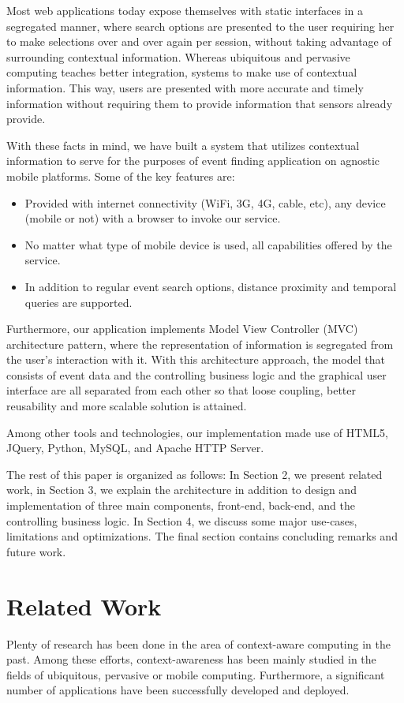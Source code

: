 \documentclass{acm_proc_article-sp}
\begin{document}
Most web applications today expose themselves with static interfaces in a segregated manner, where search options are presented to the user requiring her to make selections over and over again per session, without taking advantage of surrounding contextual information. Whereas ubiquitous and pervasive computing teaches better integration, systems to make use of contextual information. This way, users are presented with more accurate and timely information without requiring them to provide information that sensors already provide.

With these facts in mind, we have built a system that utilizes contextual information to serve for the purposes of event finding application on agnostic mobile platforms. Some of the key features are:
\begin{itemize}
\item Provided with internet connectivity (WiFi, 3G, 4G, cable, etc), any device (mobile or not) with a browser to invoke our service.
\item No matter what type of mobile device is used, all capabilities offered by the service. 
\item In addition to regular event search options, distance proximity and temporal queries are supported. 
\end{itemize}

Furthermore, our application implements Model View Controller (MVC) architecture pattern, where the representation of information is segregated from the user's interaction with it. With this architecture approach, the model that consists of event data and the controlling business logic and the graphical user interface are all separated from each other so that loose coupling, better reusability and more scalable solution is attained.

Among other tools and technologies, our implementation made use of HTML5, JQuery, Python, MySQL, and Apache HTTP Server.

The rest of this paper is organized as follows: In Section 2, we present related work, in Section 3, we explain the architecture in addition to design and implementation of three main components, front-end, back-end, and the controlling business logic. In Section 4, we discuss some major use-cases, limitations and optimizations. The final section contains concluding remarks and future work.

\section{Related Work}
Plenty of research has been done in the area of context-aware computing in the past. Among these efforts, context-awareness has been mainly studied in the fields of ubiquitous, pervasive or mobile computing. Furthermore, a significant number of applications have been
successfully developed and deployed. 
\end{document}

